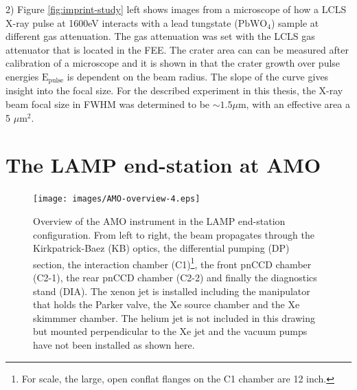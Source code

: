 2) Figure \ref{fig:imprint-study} left shows images from a microscope of how a LCLS X-ray pulse at 1600eV interacts with a lead tungstate ($\text{PbWO}_{4}$) sample at different gas attenuation. The gas attenuation was set with the LCLS gas attenuator that is located in the FEE. The crater area can can be measured after calibration of a microscope and it is shown in \citep{Liu-1982-OptLett} that the crater growth over pulse energies $\text{E}_{\text{pulse}}$ is dependent on the beam radius. The slope of the curve gives insight into the focal size. For the described experiment in this thesis, the X-ray beam focal size in FWHM was determined to be $\sim 1.5\mu$m, with an effective area a 5 $\mu\text{m}^2$.
%
%
%
\section{The LAMP end-station at AMO}\label{sec:LAMP-endstation}
\begin{figure}
	\centering
		\texttt{[image: images/AMO-overview-4.eps]}
	\caption[Overview of the AMO instrument in the LAMP end-station configuration.]{Overview of the AMO instrument in the LAMP end-station configuration. From left to right, the beam propagates through the Kirkpatrick-Baez (KB) optics, the differential pumping (DP) section, the interaction chamber (C1)\footnote{For scale, the large, open conflat flanges on the C1 chamber are 12 inch.}, the front pnCCD chamber (C2-1), the rear pnCCD chamber (C2-2) and finally the diagnostics stand (DIA). The xenon jet is installed including the manipulator that holds the Parker valve, the Xe source chamber and the Xe skimmmer chamber. The helium jet is not included in this drawing but mounted perpendicular to the Xe jet and the vacuum pumps have not been installed as shown here.}
	\label{fig:LAMP-overview}
\end{figure}
